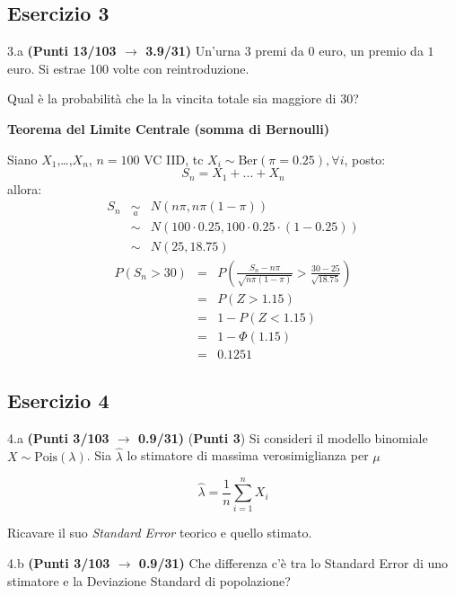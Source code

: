 \documentclass[
  11pt,
]{book}
\theoremstyle{mytheoremstyle}
\theoremstyle{mydefstyle}
\newenvironment{sol}
  {
  \begin{tcolorbox}[enhanced,breakable,arc=0.1mm,boxrule=1pt,colback=white,colframe=iblue,
  title=\bf \fontfamily{lmss}\selectfont \hspace{.5 cm} Soluzione,drop fuzzy shadow]

}{
\end{tcolorbox}
  }
\begin{document}
\subsection{Esercizio 3}\label{esercizio-3-38}

3.a \textbf{(Punti 13/103 \(\rightarrow\) 3.9/31)} Un'urna 3 premi da \(\mbox{0}\) euro, un premio da \(\mbox{1}\) euro.
Si estrae 100 volte con reintroduzione.

Qual è la probabilità che la la vincita totale sia maggiore di 30?

\begin{sol}
\textbf{Teorema del Limite Centrale (somma di Bernoulli)}

Siano \(X_1\),\ldots,\(X_n\), \(n=100\) VC IID, tc \(X_i\sim\text{Ber}(\pi=0.25)\)\(,\forall i\), posto:
\[
      S_n = X_1 + ... + X_n
      \]
allora:\begin{eqnarray*}
  S_n & \mathop{\sim}\limits_{a}& N(n\pi,n\pi(1-\pi)) \\
      &\sim & N(100\cdot0.25,100\cdot0.25\cdot(1-0.25)) \\
      &\sim & N(25,18.75)
  \end{eqnarray*}\begin{eqnarray*}
      P( S_n   >   30 ) 
        &=& P\left(  \frac { S_n  -  n\pi }{ \sqrt{n\pi(1-\pi)} }  >  \frac { 30  -  25 }{\sqrt{ 18.75 }} \right)  \\
                 &=& P\left(  Z   >   1.15 \right) \\    &=& 1-P(Z< 1.15 )\\ 
                 &=&  1-\Phi( 1.15 ) \\ &=&  0.1251 
      \end{eqnarray*}

\end{sol}

\subsection{Esercizio 4}\label{esercizio-4-38}

4.a \textbf{(Punti 3/103 \(\rightarrow\) 0.9/31)} (\textbf{Punti 3}) Si consideri il modello binomiale \(X\sim\text{Pois}(\lambda)\). Sia \(\hat\lambda\) lo stimatore di massima verosimiglianza per \(\mu\)

\[
  \hat\lambda = \frac 1n \sum_{i=1}^n X_i
\]

Ricavare il suo \emph{Standard Error} teorico e quello stimato.

4.b \textbf{(Punti 3/103 \(\rightarrow\) 0.9/31)} Che differenza c'è tra lo Standard Error di uno stimatore e la Deviazione Standard di popolazione?
\end{document}

